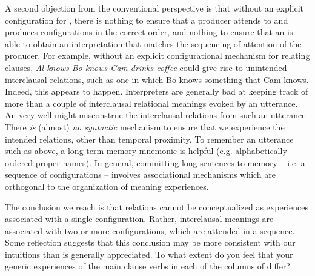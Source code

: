   A second objection from the conventional perspective is that without an explicit configuration for , there is nothing to ensure that a producer attends to and produces configurations in the correct order, and nothing to ensure that an  is able to obtain an interpretation that matches the sequencing of attention of the producer. For example, without an explicit configurational mechanism for relating clauses, \textit{Al knows Bo knows Cam drinks coffee} could give rise to unintended interclausal relations, such as one in which Bo knows something that Cam knows. Indeed, this appears to happen. Interpreters are generally bad at keeping track of more than a couple of interclausal relational meanings evoked by an utterance. An  very well might misconstrue the interclausal relations from such an utterance. There \textit{is} (almost) \textit{no syntactic} mechanism to ensure that we experience the intended  relations, other than temporal proximity. To remember an utterance such as above, a long-term memory mnemonic is helpful (e.g. alphabetically ordered proper names). In general, committing long sentences to memory -- i.e. a sequence of  configurations -- involves associational mechanisms which are orthogonal to the organization of meaning experiences.

  The conclusion we reach is that  relations cannot be conceptualized as experiences associated with a single configuration. Rather, interclausal meanings are associated with two or more configurations, which are attended in a sequence. Some reflection suggests that this conclusion may be more consistent with our intuitions than is generally appreciated. To what extent do you feel that your generic experiences of the main clause verbs in each of the columns of {} differ?

